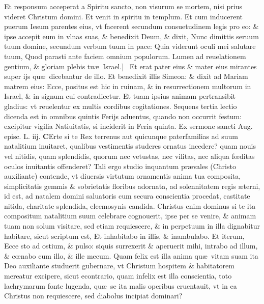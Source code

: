 \documentclass[a5paper,10pt]{book}
\def\ae{æ}
\def\oe{œ}
\begin{document}
\begin{multicols*}{2}
Et responsum acceperat a Spiritu sancto, non visurum se mortem, nisi prius videret Christum domini. Et venit in spiritu in templum.
Et cum inducerent puerum Iesum parentes eius, vt facerent secundum consuetudinem legis pro eo: \& ipse accepit eum in vlnas suas, \& benedixit Deum, \& dixit, Nunc dimittis seruum tuum domine, secundum verbum tuum in pace: Quia viderunt oculi mei salutare tuum, Quod parasti ante faciem omnium populorum.
Lumen ad reuelationem gentium, \& gloriam plebis tu\ae \ Israel.] \textdagger \ 
Et erat pater eius \& mater eius mirantes super ijs qu\ae \ dicebantur de illo.
Et benedixit illis Simeon: \& dixit ad Mariam matrem eius: Ecce, positus est hic in ruinam, \& in resurrectionem multorum in Israel, \& in signum cui contradicetur.
Et tuam ipsius animam pertransibit gladius: vt reuelentur ex multis cordibus cogitationes.
\newline {} \color{red} Sequens tertia lectio dicenda est in omnibus quintis Ferijs aduentus, quando non occurrit festum: excipitur vigilia Natiuitatis, si inciderit in Feria quinta. \color{black}
\newline \color{red} Ex sermone sancti Aug. episc. L. iij. \color{black}
\vspace{-.25em}
\lettrine[lines=2]{\bfseries \color{red} C}{}Erte si te Rex terrenus aut quicunque paterfamilias ad suum natalitium inuitaret, qualibus vestimentis studeres ornatus incedere? quam nouis vel nitidis, quam splendidis, quorum nec vetustas, nec vilitas, nec aliqua f\oe ditas oculos inuitantis offenderet?
Tali ergo studio inquantum pr\ae vales (Christo auxiliante) contende, vt diuersis virtutum ornamentis anima tua composita, simplicitatis gemmis \& sobrietatis floribus adornata, ad solennitatem regis \ae terni, id est, ad natalem domini saluatoris cum secura conscientia procedat, castitate nitida, charitate splendida, eleemosynis candida.
Christus enim dominus si te ita compositum natalitium suum celebrare cognouerit, ipse per se venire, \& animam tuam non solum visitare, sed etiam requiescere, \& in perpetuum in illa dignabitur habitare, sicut scriptum est, Et inhabitabo in illis, \& inambulabo.
Et iterum, Ecce sto ad ostium, \& pulso: siquis surrexerit \& aperuerit mihi, intrabo ad illum, \& c\oe nabo cum illo, \& ille mecum.
Quam felix est illa anima qu\ae \ vitam suam ita Deo auxiliante studuerit gubernare, vt Christum hospitem \& habitatorem mereatur excipere, sicut econtrario, quam infelix est illa conscientia, toto lachrymarum fonte lugenda, qu\ae \ se ita malis operibus cruentauit, vt in ea Christus non requiescere, sed diabolus incipiat dominari?

\end{multicols*}
\end{document}
